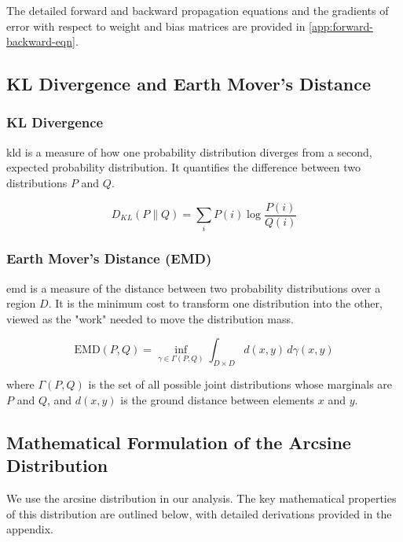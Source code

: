 \documentclass{ioereport}
\begin{document}
The detailed forward and backward propagation equations and the gradients of error with respect to weight and bias matrices are provided in \autoref{app:forward-backward-eqn}.




\subsection{KL Divergence and Earth Mover's Distance}

\subsubsection{KL Divergence}
\gls{kld} is a measure of how one probability distribution diverges from a second, expected probability distribution. It quantifies the difference between two distributions \( P \) and \( Q \).

\begin{equation}
    D_{KL}(P \parallel Q) = \sum_{i} P(i) \log \frac{P(i)}{Q(i)}
\end{equation}

\subsubsection{Earth Mover's Distance (EMD)}
\gls{emd} is a measure of the distance between two probability distributions over a region \( D \). It is the minimum cost to transform one distribution into the other, viewed as the "work" needed to move the distribution mass.

\begin{equation}
    \text{EMD}(P, Q) = \inf_{\gamma \in \Gamma(P,Q)} \int_{D \times D} d(x, y) \, d\gamma(x, y)
\end{equation}

where \( \Gamma(P, Q) \) is the set of all possible joint distributions whose marginals are \( P \) and \( Q \), and \( d(x, y) \) is the ground distance between elements \( x \) and \( y \).

\pagebreak


\subsection{Mathematical Formulation of the Arcsine Distribution}

We use the arcsine distribution in our analysis. The key mathematical properties of this distribution are outlined below, with detailed derivations provided in the appendix.
\end{document}

